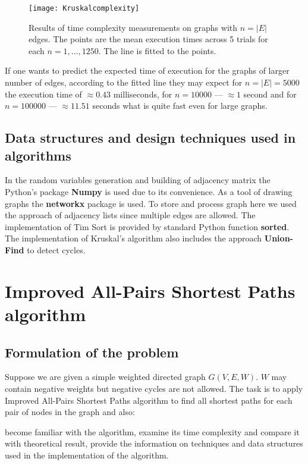 \documentclass[12pt, bachelor, substylefile = algo_title.rtx]{disser}
\theoremstyle{definition}
\begin{document}
\begin{figure}[h]
\begin{center}
\texttt{[image: Kruskalcomplexity]}
\caption{Results of time complexity measurements on graphs with $n = |E|$ edges. The points are the mean execution times across 5 trials for each $n = 1,\dots,1250$. The line is fitted to the points.}
\label{fig: 05}
\end{center}
\end{figure}

If one wants to predict the expected time of execution for the graphs of larger number of edges, according to the fitted line they may expect for $n = |E| = 5000$ the execution time of $\approx 0.43$ milliseconds, for $n = 10000$ --- $\approx 1 $ second and for $n = 100000$ --- $\approx 11.51$ seconds what is quite fast even for large graphs.

\section{Data structures and design techniques used in algorithms}
In the random variables generation and building of adjacency matrix the Python's package \textbf{Numpy} is used due to its convenience. As a tool of drawing graphs the \textbf{networkx} package is used. To store and process graph here we used the approach of adjacency lists since multiple edges are allowed. The implementation of Tim Sort is provided by standard Python function \textbf{sorted}. The implementation of Kruskal's algorithm also includes the approach \textbf{Union-Find} \cite{Conchon07} to detect cycles.

\chapter{Improved All-Pairs Shortest Paths algorithm}
\label{ch: 2}
\section{Formulation of the problem}
Suppose we are given a simple weighted directed graph $G(V, E, W)$. $W$ may contain negative weights but negative cycles are not allowed. The task is to apply Improved All-Pairs Shortest Paths algorithm to find all shortest paths for each pair of nodes in the graph and also:
\begin{outline}
\1 become familiar with the algorithm,
\1 examine its time complexity and compare it with theoretical result,
\1 provide the information on techniques and data structures used in the implementation of the algorithm.
\end{outline}
\end{document}
